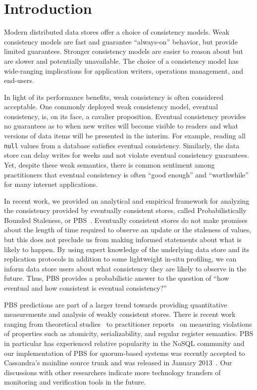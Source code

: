 \section{Introduction}

Modern distributed data stores offer a choice of consistency
models. Weak consistency models are fast and guarantee ``always-on''
behavior, but provide limited guarantees. Stronger consistency models
are easier to reason about but are slower and potentially
unavailable. The choice of a consistency model has wide-ranging implications
for application writers, operations management, and
end-users. 

In light of its performance benefits, weak
consistency is often considered acceptable.
One commonly deployed weak consistency model, eventual
consistency, is, on its face, a cavalier proposition. Eventual
consistency provides no guarantees as to when new writes will become
visible to readers and what versions of data items will be presented
in the interim. For example, reading all \texttt{null} values from a
database satisfies eventual consistency. Similarly, the data store can
delay writes for weeks and not violate eventual
consistency guarantees. Yet, despite these weak semantics, there is
common sentiment among practitioners that eventual consistency is
often ``good enough'' and ``worthwhile'' for many
internet applications.

In recent work, we provided an analytical and empirical framework for
analyzing the consistency provided by eventually consistent stores,
called Probabilistically Bounded Staleness, or
PBS~\cite{pbs-vldb2012}. Eventually consistent stores do not make promises
about the length of time required to observe an update or
the staleness of values, but this does not preclude us from making
informed statements about what is likely to happen. By using expert
knowledge of the underlying data store and its replication protocols
in addition to some lightweight in-situ profiling, we can inform data
store users about what consistency they are likely to observe in the
future. Thus, PBS provides a probabilistic answer to the question 
of ``how eventual and how consistent is eventual consistency?''

PBS predictions are part of a larger trend towards providing
quantitative measurements and analysis of weakly consistent
stores. There is recent work ranging from theoretical studies~\cite{podc-hpl}
to practitioner reports~\cite{hotdep} on measuring violations of
properties such as atomicity, serializability, and regular register
semantics. PBS in particular has experienced relative
popularity in the NoSQL community and our implementation of PBS for
quorum-based systems was recently accepted to Cassandra's mainline
source trunk and was released in January 2013~\cite{cassandra-pbs-patch}. 
Our discussions with other researchers indicate more technology transfers 
of monitoring and verification tools in the future.

